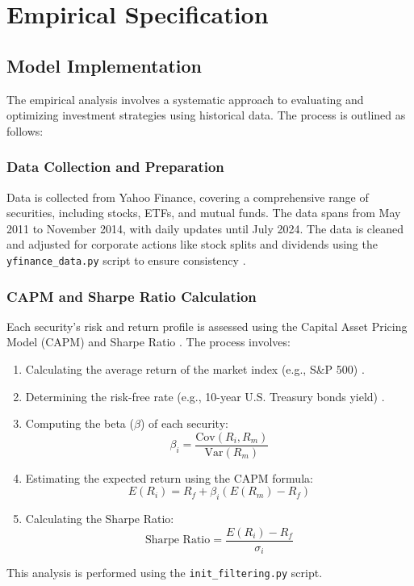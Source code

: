 \section{Empirical Specification}

\subsection{Model Implementation}
The empirical analysis involves a systematic approach to evaluating and optimizing investment strategies using historical data. The process is outlined as follows:

\subsubsection{Data Collection and Preparation}
Data is collected from Yahoo Finance, covering a comprehensive range of securities, including stocks, ETFs, and mutual funds. The data spans from May 2011 to November 2014, with daily updates until July 2024. The data is cleaned and adjusted for corporate actions like stock splits and dividends using the \texttt{yfinance\_data.py} script to ensure consistency \citep{yfinance}.

\subsubsection{CAPM and Sharpe Ratio Calculation}
Each security's risk and return profile is assessed using the Capital Asset Pricing Model (CAPM) \citep{sharpe1964capital} and Sharpe Ratio \citep{sharpe1966mutual}. The process involves:
\begin{enumerate}
    \item Calculating the average return of the market index (e.g., S\&P 500) \citep{fama1970efficient}.
    \item Determining the risk-free rate (e.g., 10-year U.S. Treasury bonds yield) \citep{shiller1992stock}.
    \item Computing the beta (\(\beta\)) of each security:
    \begin{equation}
        \beta_i = \frac{\text{Cov}(R_i, R_m)}{\text{Var}(R_m)}
    \end{equation}
    \item Estimating the expected return using the CAPM formula:
    \begin{equation}
        E(R_i) = R_f + \beta_i (E(R_m) - R_f)
    \end{equation}
    \item Calculating the Sharpe Ratio:
    \begin{equation}
        \text{Sharpe Ratio} = \frac{E(R_i) - R_f}{\sigma_i}
    \end{equation}
\end{enumerate}
This analysis is performed using the \texttt{init\_filtering.py} script.

